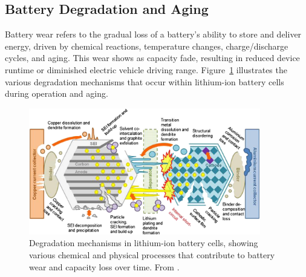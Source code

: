 \subsection{Battery Degradation and Aging}
\label{sec:degradation}

Battery wear refers to the gradual loss of a battery's ability to store and deliver energy, driven by chemical reactions, temperature changes, charge/discharge cycles, and aging. This wear shows as capacity fade, resulting in reduced device runtime or diminished electric vehicle driving range. Figure~\ref{fig:degradation_mechanisms} illustrates the various degradation mechanisms that occur within lithium-ion battery cells during operation and aging.

\begin{figure}[htbp]
\centering
\includegraphics[width=0.9\textwidth]{imgs/Degradation mechanisms in Li-ion cells.jpg}
\caption{Degradation mechanisms in lithium-ion battery cells, showing various chemical and physical processes that contribute to battery wear and capacity loss over time. From \cite{kabir_degradation_2017}.}
\label{fig:degradation_mechanisms}
\end{figure}


